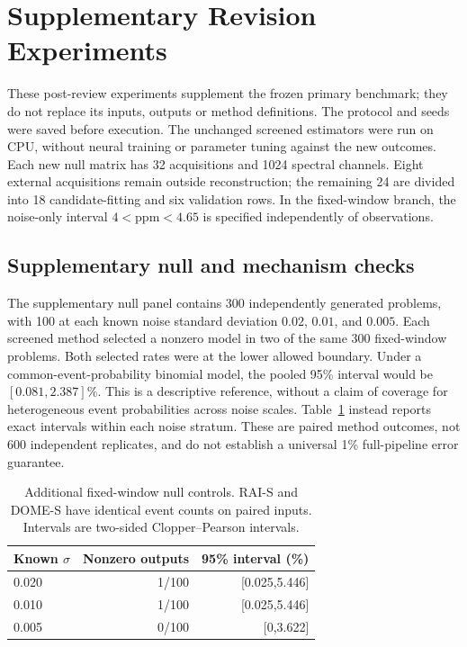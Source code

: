 \section{Supplementary Revision Experiments}\label{app:revisionvalidation}
These post-review experiments supplement the frozen primary benchmark; they do not replace its inputs, outputs or method definitions. The protocol and seeds were saved before execution. The unchanged screened estimators were run on CPU, without neural training or parameter tuning against the new outcomes. Each new null matrix has 32 acquisitions and 1024 spectral channels. Eight external acquisitions remain outside reconstruction; the remaining 24 are divided into 18 candidate-fitting and six validation rows. In the fixed-window branch, the noise-only interval $4<\mathrm{ppm}<4.65$ is specified independently of observations.

\subsection{Supplementary null and mechanism checks}
The supplementary null panel contains 300 independently generated problems,
with 100 at each known noise standard deviation $0.02$, $0.01$, and $0.005$.
Each screened method selected a nonzero model in two of the same 300 fixed-window
problems. Both selected rates were at the lower allowed boundary.
Under a common-event-probability binomial model, the pooled 95\% interval
would be $[0.081,2.387]\%$. This is a descriptive reference, without a claim
of coverage for heterogeneous event probabilities across noise scales.
Table~\ref{tab:revisionnull} instead reports exact intervals within each noise stratum.
These are paired method outcomes, not 600 independent replicates, and do not
establish a universal 1\% full-pipeline error guarantee.

\begin{table}[htbp]\centering
\caption{Additional fixed-window null controls. RAI-S and DOME-S have identical
event counts on paired inputs. Intervals are two-sided Clopper--Pearson intervals.}
\label{tab:revisionnull}
\begin{tabular}{lrr}\toprule
Known $\sigma$ & Nonzero outputs & 95\% interval (\%)\\\midrule
0.020 & 1/100 & [0.025,5.446]\\
0.010 & 1/100 & [0.025,5.446]\\
0.005 & 0/100 & [0,3.622]\\\bottomrule
\end{tabular}
\end{table}

